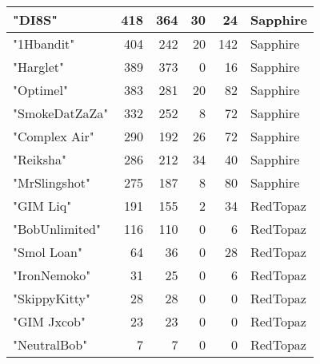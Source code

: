 \documentclass{article}
\begin{document}
\begin{table}[htbp]
\begin{tabular}{|l|r|r|r|r|l|}
"DI8S" & 418 & 364 & 30 & 24 & Sapphire \\ \hline
"1Hbandit" & 404 & 242 & 20 & 142 & Sapphire \\ \hline
"Harglet" & 389 & 373 & 0 & 16 & Sapphire \\ \hline
"Optimel" & 383 & 281 & 20 & 82 & Sapphire \\ \hline
"SmokeDatZaZa" & 332 & 252 & 8 & 72 & Sapphire \\ \hline
"Complex Air" & 290 & 192 & 26 & 72 & Sapphire \\ \hline
"Reiksha" & 286 & 212 & 34 & 40 & Sapphire \\ \hline
"MrSlingshot" & 275 & 187 & 8 & 80 & Sapphire \\ \hline
"GIM Liq" & 191 & 155 & 2 & 34 & RedTopaz \\ \hline
"BobUnlimited" & 116 & 110 & 0 & 6 & RedTopaz \\ \hline
"Smol Loan" & 64 & 36 & 0 & 28 & RedTopaz \\ \hline
"IronNemoko" & 31 & 25 & 0 & 6 & RedTopaz \\ \hline
"SkippyKitty" & 28 & 28 & 0 & 0 & RedTopaz \\ \hline
"GIM Jxcob" & 23 & 23 & 0 & 0 & RedTopaz \\ \hline
"NeutralBob" & 7 & 7 & 0 & 0 & RedTopaz \\ \hline
\end{tabular}
\end{table}
\end{document}
